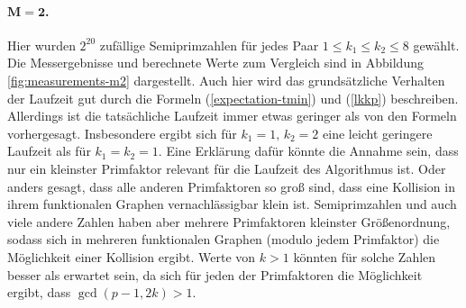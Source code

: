 \documentclass[a4paper, 10pt, ngerman]{article}
\begin{document}
    \paragraph{$\pmb{M = 2}$.} Hier wurden $2^{20}$ zufällige Semiprimzahlen für jedes Paar $1 \le k_1 \le k_2 \le 8$ gewählt. Die Messergebnisse und berechnete Werte zum Vergleich sind in Abbildung \ref{fig:measurements-m2} dargestellt. Auch hier wird das grundsätzliche Verhalten der Laufzeit gut durch die Formeln (\ref{expectation-tmin}) und (\ref{lkkp}) beschreiben. Allerdings ist die tatsächliche Laufzeit immer etwas geringer als von den Formeln vorhergesagt. Insbesondere ergibt sich für $k_1 = 1, \, k_2 = 2$ eine leicht geringere Laufzeit als für $k_1 = k_2 = 1$. Eine Erklärung dafür könnte die Annahme sein, dass nur ein kleinster Primfaktor relevant für die Laufzeit des Algorithmus ist. Oder anders gesagt, dass alle anderen Primfaktoren so groß sind, dass eine Kollision in ihrem funktionalen Graphen vernachlässigbar klein ist. Semiprimzahlen und auch viele andere Zahlen haben aber mehrere Primfaktoren kleinster Größenordnung, sodass sich in mehreren funktionalen Graphen (modulo jedem Primfaktor) die Möglichkeit einer Kollision ergibt. Werte von $k > 1$ könnten für solche Zahlen besser als erwartet sein, da sich für jeden der Primfaktoren die Möglichkeit ergibt, dass $\gcd(p - 1, 2k) > 1$.
\end{document}
